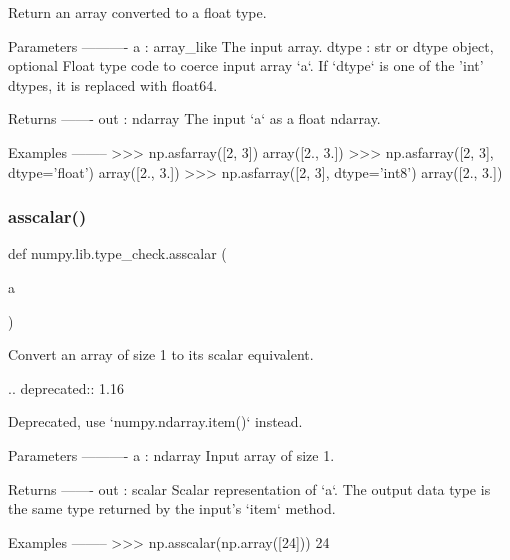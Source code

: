 \begin{DoxyVerb}Return an array converted to a float type.

Parameters
----------
a : array_like
    The input array.
dtype : str or dtype object, optional
    Float type code to coerce input array `a`.  If `dtype` is one of the
    'int' dtypes, it is replaced with float64.

Returns
-------
out : ndarray
    The input `a` as a float ndarray.

Examples
--------
>>> np.asfarray([2, 3])
array([2.,  3.])
>>> np.asfarray([2, 3], dtype='float')
array([2.,  3.])
>>> np.asfarray([2, 3], dtype='int8')
array([2.,  3.])\end{DoxyVerb}
 \mbox{\label{namespacenumpy_1_1lib_1_1type__check_a71ca4737b4990b88a935aa95d56223ef}} 
\subsubsection{\texorpdfstring{asscalar()}{asscalar()}}
{\footnotesize\ttfamily def numpy.\+lib.\+type\+\_\+check.\+asscalar (\begin{DoxyParamCaption}\item[{}]{a }\end{DoxyParamCaption})}

\begin{DoxyVerb}Convert an array of size 1 to its scalar equivalent.

.. deprecated:: 1.16

    Deprecated, use `numpy.ndarray.item()` instead.

Parameters
----------
a : ndarray
    Input array of size 1.

Returns
-------
out : scalar
    Scalar representation of `a`. The output data type is the same type
    returned by the input's `item` method.

Examples
--------
>>> np.asscalar(np.array([24]))
24
\end{DoxyVerb}
 \mbox{\label{namespacenumpy_1_1lib_1_1type__check_ad11c5d561fadf051427821a0f1749879}} 
